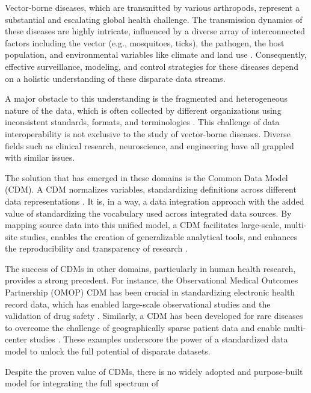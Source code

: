 \documentclass{article}
\begin{document}
\par
Vector-borne diseases, which are transmitted by various arthropods, represent a substantial and escalating global health 
challenge. The transmission dynamics of these diseases are highly intricate, influenced by a diverse array of interconnected 
factors including the vector (e.g., mosquitoes, ticks), the pathogen, the host population, and environmental variables like 
climate and land use \citep{2025.RL.HMD}. Consequently, effective surveillance, modeling, and control strategies for these 
diseases depend on a holistic understanding of these disparate data streams. 
\par
A major obstacle to this understanding is the fragmented and heterogeneous nature of the data, which is often collected 
by different organizations using inconsistent standards, formats, and terminologies \citep{2025.RL.HMD}. This challenge of 
data interoperability is not exclusive to the study of vector-borne diseases. Diverse fields such as clinical research, 
neuroscience, and engineering have all grappled with similar issues. 
\par
The solution that has emerged in these domains is the Common Data Model (CDM). A CDM normalizes variables, standardizing 
definitions across different data representations \citep{2024.NA.HTC}. It is, in a way, a data integration approach with 
the added value of standardizing the vocabulary used across integrated data sources. By mapping source data into this 
unified model, a CDM facilitates large-scale, multi-site studies, enables the creation of generalizable analytical tools, 
and enhances the reproducibility and transparency of research \citep{2024.NA.HTC, 2024.MF.TPC}. 
\par
The success of CDMs in other domains, particularly in human health research, provides a strong precedent. For instance, 
the Observational Medical Outcomes Partnership (OMOP) CDM has been crucial in standardizing electronic health record data, 
which has enabled large-scale observational studies and the validation of drug safety \citep{2024.NA.HTC, 2024.MF.TPC, 
2023.AS.ACD, 2021.YG.BDA, 2019.JG.DMH}. Similarly, a CDM has been developed for rare diseases to overcome the challenge 
of geographically sparse patient data and enable multi-center studies \citep{2024.NA.HTC}. These examples underscore the 
power of a standardized data model to unlock the full potential of disparate datasets.
\par
Despite the proven value of CDMs, there is no widely adopted and purpose-built model for integrating the full spectrum of 
\end{document}
